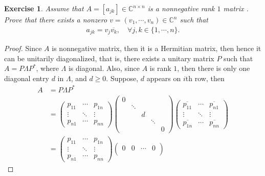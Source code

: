 \documentclass[11pt]{article}
\newtheorem{exercise}{Exercise}[section]
\theoremstyle{definition}
\numberwithin{equation}{subsection}
\begin{document}
\medskip

\begin{exercise}
Assume that $A = \left[a_{jk}\right] \in \mathbb{C}^{n \times n}$ is a nonnegative rank $1$ matrix . Prove that there exists a nonzero $v = (v_1, \cdots, v_n) \in \mathbb{C}^{n}$ such that
\begin{align*}
    a_{jk} = v_j \overline{v_k}, \quad \forall j,k \in \{1, \cdots, n\}.
\end{align*}
\end{exercise}
\begin{proof}
Since $A$ is nonnegative matrix, then it is a Hermitian matrix, then hence it can be unitarily diagonalized, that is, there exists a unitary matrix $P$ such that $A = P \Lambda P^*$, where $\Lambda$ is diagonal. Also, since $A$ is rank $1$, then there is only one diagonal entry $d$ in $\Lambda$, and $d \geq 0$. Suppose, $d$ appears on $i$th row, then
\begin{align*}
    A & = P \Lambda P^* \\
    & = \begin{pmatrix}
        p_{11} & \cdots & p_{1n} \\
        \vdots & \ddots & \vdots \\
        p_{n1} & \cdots & p_{nn}
    \end{pmatrix}
    \begin{pmatrix}
        0 &  &  &  & \\
        & \ddots &  &  & \\
        &  & d &  & \\ 
        &  &  & \ddots & \\
        &  &  &  & 0 
    \end{pmatrix}
    \begin{pmatrix}
        \overline{p_{11}} & \cdots & \overline{p_{n1}} \\
        \vdots & \ddots & \vdots \\
        \overline{p_{1n}} & \cdots & \overline{p_{nn}}
    \end{pmatrix} \\
    & = \begin{pmatrix}
        p_{11} & \cdots & p_{1n} \\
        \vdots & \ddots & \vdots \\
        p_{n1} & \cdots & p_{nn}
    \end{pmatrix} 
    \begin{pmatrix}
        0 & 0 & \cdots & 0 \\

\end{pmatrix}
\end{align*}
\end{proof}
\end{document}
